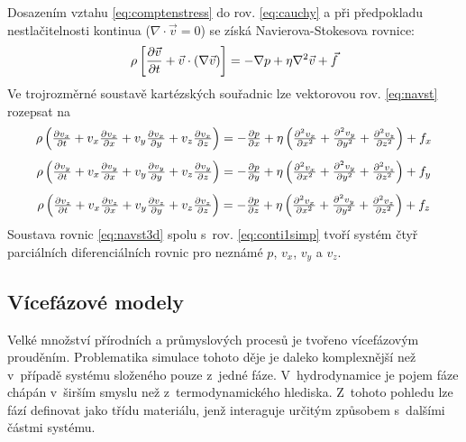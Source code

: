 Dosazením vztahu \ref{eq:comptenstress} do rov. \ref{eq:cauchy} a při předpokladu nestlačitelnosti kontinua ($\nabla \cdot \vec{v} = 0$) se získá Navierova-Stokesova rovnice:
\begin{equation}
    \rho \left[ \frac{\partial \vec{v}}{\partial t} + \vec{v} \cdot \left( \nabla  \vec{v} \right) \right] = -\nabla p + \eta \nabla^{2}\vec{v}  + \vec{f}
  	\label{eq:navst}
\end{equation} 
Ve trojrozměrné soustavě kartézských souřadnic lze vektorovou rov. \ref{eq:navst} rozepsat na 
\begin{equation}
\begin{array}{c}
    \rho \left( \frac{\partial v_{x}}{\partial t} + v_{x}\frac{\partial v_{x}}{\partial x} + v_{y}\frac{\partial v_{x}}{\partial y} + v_{z}\frac{\partial v_{x}}{\partial z} \right) = -\frac{\partial p}{\partial x} +  \eta \left( \frac{\partial^{2} v_{x}}{\partial x^{2}} + \frac{\partial^{2} v_{y}}{\partial y^{2}} + \frac{\partial^{2} v_{z}}{\partial z^{2}} \right) + f_{x}   \vspace{3mm} \\
    
    \rho \left( \frac{\partial v_{y}}{\partial t} + v_{x}\frac{\partial v_{y}}{\partial x} + v_{y}\frac{\partial v_{y}}{\partial y} + v_{z}\frac{\partial v_{y}}{\partial z} \right) = -\frac{\partial p}{\partial y} +  \eta \left( \frac{\partial^{2} v_{x}}{\partial x^{2}} + \frac{\partial^{2} v_{y}}{\partial y^{2}} + \frac{\partial^{2} v_{z}}{\partial z^{2}} \right) + f_{y}   \vspace{3mm} \\
    
    \rho \left( \frac{\partial v_{z}}{\partial t} + v_{x}\frac{\partial v_{z}}{\partial x} + v_{y}\frac{\partial v_{z}}{\partial y} + v_{z}\frac{\partial v_{z}}{\partial z} \right) = -\frac{\partial p}{\partial z} +  \eta \left( \frac{\partial^{2} v_{x}}{\partial x^{2}} + \frac{\partial^{2} v_{y}}{\partial y^{2}} + \frac{\partial^{2} v_{z}}{\partial z^{2}} \right) + f_{z}   \\
    \end{array}
  	\label{eq:navst3d}
\end{equation} 
Soustava rovnic \ref{eq:navst3d} spolu s~rov. \ref{eq:conti1simp} tvoří systém čtyř parciálních diferenciálních rovnic pro neznámé $p$, $v_{x}$, $v_{y}$ a $v_{z}$. 

\subsection{Vícefázové modely}
Velké množství přírodních a průmyslových procesů je tvořeno vícefázovým prouděním. Problematika simulace tohoto děje je daleko komplexnější než v~případě systému složeného pouze z~jedné fáze. V~hydrodynamice je pojem fáze chápán v~širším smyslu než z~termodynamického hlediska. Z~tohoto pohledu lze fází definovat jako třídu materiálu, jenž interaguje určitým způsobem s~dalšími částmi systému. 

